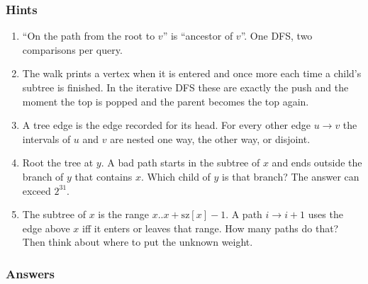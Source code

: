 \subsubsection*{Hints}
\begin{enumerate}[leftmargin=*, label=\textbf{E3.\arabic*}]
    \item ``On the path from the root to $v$'' is ``ancestor of $v$''. One DFS, two comparisons per query.
    \item The walk prints a vertex when it is entered and once more each time a child's subtree is finished. In the iterative DFS these are exactly the push and the moment the top is popped and the parent becomes the top again.
    \item A tree edge is the edge recorded for its head. For every other edge $u \to v$ the intervals of $u$ and $v$ are nested one way, the other way, or disjoint.
    \item Root the tree at $y$. A bad path starts in the subtree of $x$ and ends outside the branch of $y$ that contains $x$. Which child of $y$ is that branch? The answer can exceed $2^{31}$.
    \item The subtree of $x$ is the range $x..x+\mathrm{sz}[x]-1$. A path $i \to i+1$ uses the edge above $x$ iff it enters or leaves that range. How many paths do that? Then think about where to put the unknown weight.
\end{enumerate}

\subsubsection*{Answers}

